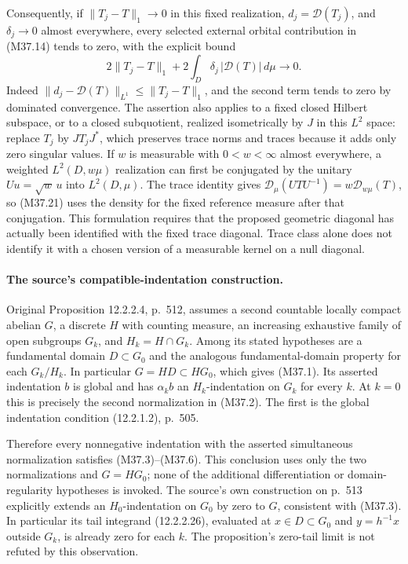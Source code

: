 Consequently, if $\|T_j-T\|_1\to0$ in this fixed realization,
$d_j=\mathcal D(T_j)$, and $\delta_j\to0$ almost everywhere,
every selected external orbital contribution in (M37.14)
tends to zero, with the explicit bound
\[
 2\|T_j-T\|_1+
       2\int_D\delta_j\,|\mathcal D(T)|\,d\mu
                         \longrightarrow0.
 \tag{M37.21}
\]
Indeed $\|d_j-\mathcal D(T)\|_{L^1}\le\|T_j-T\|_1$,
and the second term tends to zero by dominated convergence.
The assertion also applies to a fixed closed Hilbert subspace,
or to a closed subquotient, realized isometrically by $J$ in
this $L^2$ space: replace $T_j$ by $JT_jJ^*$, which preserves
trace norms and traces because it adds only zero singular
values.  If $w$ is measurable with $0<w<\infty$ almost
everywhere, a weighted $L^2(D,w\mu)$ realization can first
be conjugated by the unitary $Uu=\sqrt w\,u$ into $L^2(D,\mu)$.
The trace identity gives
$\mathcal D_\mu(UTU^{-1})=w\mathcal D_{w\mu}(T)$,
so (M37.21) uses the density for the fixed reference measure
after that conjugation.
This formulation requires that the proposed geometric diagonal
has actually been identified with the fixed trace diagonal.
Trace class alone does not identify it with a chosen version
of a measurable kernel on a null diagonal.

\paragraph{The source's compatible-indentation construction.}
Original Proposition 12.2.2.4, p.~512, assumes a second
countable locally compact abelian $G$, a discrete $H$
with counting measure, an increasing exhaustive family
of open subgroups $G_k$, and $H_k=H\cap G_k$.
Among its stated hypotheses are a fundamental domain
$D\subset G_0$ and the analogous fundamental-domain
property for each $G_k/H_k$.  In particular
$G=HD\subset HG_0$, which gives (M37.1).
Its asserted indentation $b$ is global and has
$\alpha_kb$ an $H_k$-indentation on $G_k$ for every
$k$.  At $k=0$ this is precisely the second
normalization in (M37.2).  The first is the global
indentation condition (12.2.1.2), p.~505.

Therefore every nonnegative indentation with the
asserted simultaneous normalization satisfies
(M37.3)--(M37.6).  This conclusion uses only the
two normalizations and $G=HG_0$; none of the additional
differentiation or domain-regularity hypotheses is
invoked.  The source's own construction on p.~513
explicitly extends an $H_0$-indentation on $G_0$
by zero to $G$, consistent with (M37.3).
In particular its tail integrand (12.2.2.26), evaluated
at $x\in D\subset G_0$ and $y=h^{-1}x$ outside $G_k$,
is already zero for each $k$.  The proposition's
zero-tail limit is not refuted by this observation.

